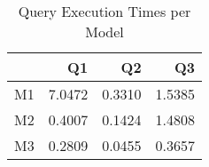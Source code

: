 \begin{table}[H]
\centering
\caption{Query Execution Times per Model}
\label{tab:model_comparison}
\begin{tabular}{lrrr}
\toprule
 & Q1 & Q2 & Q3 \\
\midrule
M1 & 7.0472 & 0.3310 & 1.5385 \\
M2 & 0.4007 & 0.1424 & 1.4808 \\
M3 & 0.2809 & 0.0455 & 0.3657 \\
\bottomrule
\end{tabular}
\end{table}
